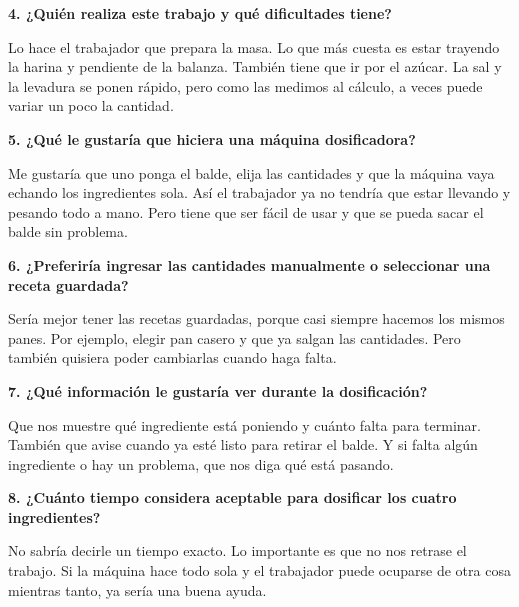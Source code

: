 \par\medskip

\noindent
\textbf{4. ¿Quién realiza este trabajo y qué dificultades tiene?}

\par\medskip
Lo hace el trabajador que prepara la masa. Lo que más cuesta es estar trayendo la harina y pendiente de la balanza. También tiene que ir por el azúcar. La sal y la levadura se ponen rápido, pero como las medimos al cálculo, a veces puede variar un poco la cantidad.

\par\medskip

\noindent
\textbf{5. ¿Qué le gustaría que hiciera una máquina dosificadora?}

\par\medskip
Me gustaría que uno ponga el balde, elija las cantidades y que la máquina vaya echando los ingredientes sola. Así el trabajador ya no tendría que estar llevando y pesando todo a mano. Pero tiene que ser fácil de usar y que se pueda sacar el balde sin problema.

\par\medskip

\noindent
\textbf{6. ¿Preferiría ingresar las cantidades manualmente o seleccionar una receta guardada?}

\par\medskip
Sería mejor tener las recetas guardadas, porque casi siempre hacemos los mismos panes. Por ejemplo, elegir pan casero y que ya salgan las cantidades. Pero también quisiera poder cambiarlas cuando haga falta.

\par\medskip

\noindent
\textbf{7. ¿Qué información le gustaría ver durante la dosificación?}

\par\medskip
Que nos muestre qué ingrediente está poniendo y cuánto falta para terminar. También que avise cuando ya esté listo para retirar el balde. Y si falta algún ingrediente o hay un problema, que nos diga qué está pasando.

\par\medskip

\noindent
\textbf{8. ¿Cuánto tiempo considera aceptable para dosificar los cuatro ingredientes?}

\par\medskip
No sabría decirle un tiempo exacto. Lo importante es que no nos retrase el trabajo. Si la máquina hace todo sola y el trabajador puede ocuparse de otra cosa mientras tanto, ya sería una buena ayuda.


